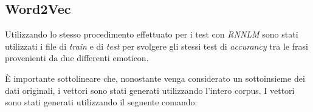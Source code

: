 \documentclass[a4paper,12pt,openright,twoside]{report}
\theoremstyle{definition}
\begin{document}

\subsection{Word2Vec}
\label{sss:word2vec}
Utilizzando lo stesso procedimento effettuato per i test con \emph{RNNLM} sono stati utilizzati i file di \emph{train} e di \emph{test}
per svolgere gli stessi test di \emph{accurancy} tra le frasi provenienti da due differenti emoticon.

\`E importante sottolineare che, nonostante venga considerato un sottoinsieme dei dati originali, i vettori sono stati generati utilizzando 
l'intero corpus. I vettori sono stati generati utilizzando il seguente comando:
\end{document}
